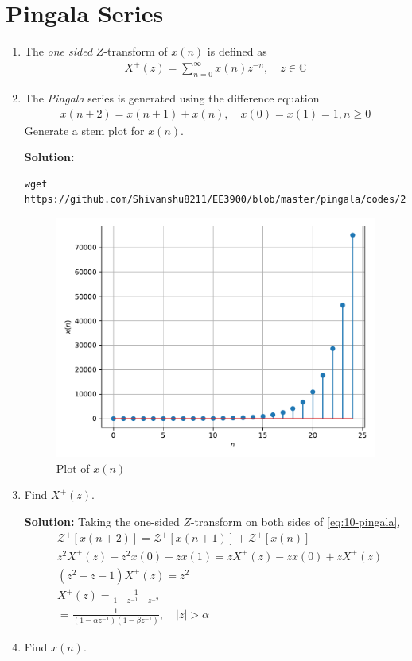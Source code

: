\documentclass[journal,12pt,twocolumn]{IEEEtran}
\newcommand{\solution}{\noindent \textbf{Solution: }}
\providecommand{\brak}[1]{\ensuremath{\left(#1\right)}}
\providecommand{\sbrak}[1]{\ensuremath{\left[#1\right]}}
\numberwithin{equation}{section}
\renewcommand\thesection{\arabic{section}}
\begin{document}
\section{Pingala Series}
\begin{enumerate}[label=\thesection.\arabic*,ref=\thesection.\theenumi]
\item The {\em one sided} $Z$-transform of $x(n)$ is defined as 
\begin{align}
	X^{+}(z) = \sum_{n = 0}^{\infty}x(n)z^{-n}, \quad z \in \mathbb{C}
\label{eq:one-Z}
\end{align}
	\item The {\em Pingala} series is generated using the difference equation 
\begin{align}
	x(n+2) = x\brak{n+1} + x\brak{n},  \quad x(0) = x(1) = 1, n \ge 0
	\label{eq:10-pingala}
\end{align}
Generate a stem plot for $x(n)$.

\solution
\begin{lstlisting}
wget https://github.com/Shivanshu8211/EE3900/blob/master/pingala/codes/2.1.py
\end{lstlisting}

\begin{figure}[!htp]
    \includegraphics[width=\columnwidth]{figs/2.1}
   \caption{Plot of $x(n)$}
 \label{fig:xn}
\end{figure}
\item Find $X^{+}(z)$.

\solution Taking the one-sided $Z$-transform on both sides of \eqref{eq:10-pingala},
\begin{align}
    &\mathcal{Z}^+\sbrak{x(n + 2)} = \mathcal{Z}^+\sbrak{x(n + 1)} + \mathcal{Z}^+\sbrak{x(n)} \\
    &z^2X^+(z) - z^2x(0) - zx(1) = zX^+(z) - zx(0) + zX^+(z) \\
    &\brak{z^2 - z - 1}X^+(z) = z^2 \\
    &X^+(z) = \frac{1}{1 - z^{-1} - z^{-2}} \\
    &= \frac{1}{\brak{1 - \alpha z^{-1}}\brak{1 - \beta z^{-1}}}, \quad |z| > \alpha
    \label{eq:X-z}
\end{align}
\item Find $x(n)$.


\end{enumerate}
\end{document}
